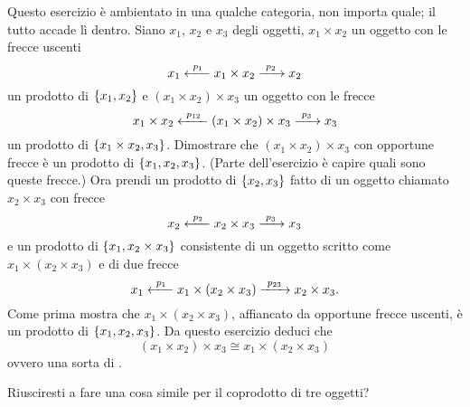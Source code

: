 
\begin{esercizio}
Questo esercizio è ambientato in una qualche categoria, non importa quale; il tutto accade lì dentro. Siano \(x_1\), \(x_2\) e \(x_3\) degli oggetti, \(x_1 \times x_2\) un oggetto con le frecce uscenti
\[x_1 \xleftarrow{\ p_1\ } x_1 \times x_2 \xrightarrow{\ p_2\ } x_2\]
un prodotto di \(\left\{x_1, x_2\right\}\) e \((x_1 \times x_2) \times x_3\) un oggetto con le frecce
\[x_1 \times x_2 \xleftarrow{\ p_{12}\ } (x_1 \times x_2) \times x_3 \xrightarrow{\ p_3\ } x_3\]
un prodotto di \(\left\{x_1 \times x_2, x_3\right\}\). Dimostrare che \((x_1 \times x_2) \times x_3\) con opportune frecce è un prodotto di \(\left\{x_1, x_2, x_3\right\}\). (Parte dell'esercizio è capire quali sono queste frecce.) Ora prendi un prodotto di \(\left\{x_2, x_3\right\}\) fatto di un oggetto chiamato \(x_2 \times x_3\) con frecce
\[x_2 \xleftarrow{\ p_2\ } x_2 \times x_3 \xrightarrow{\ p_3\ } x_3\]
e un prodotto di \(\left\{x_1, x_2 \times x_3\right\}\) consistente di un oggetto scritto come \(x_1 \times (x_2 \times x_3)\) e di due frecce
\[x_1 \xleftarrow{\ p_1\ } x_1 \times (x_2 \times x_3) \xrightarrow{\ p_{23}\ } x_2 \times x_3.\]
Come prima mostra che \(x_1 \times (x_2 \times x_3)\), affiancato da opportune frecce uscenti, è un prodotto di \(\left\{x_1, x_2, x_3\right\}\).\newline
Da questo esercizio deduci che
\[(x_1 \times x_2) \times x_3 \cong x_1 \times (x_2 \times x_3)\]
ovvero una sorta di .
\end{esercizio}

\begin{esercizio}
Riusciresti a fare una cosa simile per il coprodotto di tre oggetti?
\end{esercizio}
